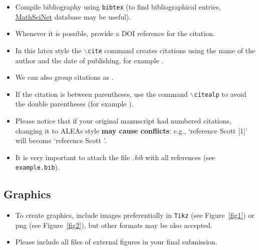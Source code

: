 \documentclass[reqno,final,11pt]{amsart}
\renewcommand{\cite}{\citet}
\theoremstyle{plain}
\theoremstyle{definition}
\theoremstyle{remark}
\begin{document}
\begin{itemize}
\item Compile bibliography using {\tt bibtex} (to find bibliographical entries,
\href{https://mathscinet.ams.org/mathscinet/}{MathSciNet} database may be
        useful).

\item Whenever it is possible, provide a DOI reference for the citation.

\item In this latex style the {\tt $\backslash$cite} command creates
citations using the name of the author and the date of publishing, for
example \cite{MR1557756}.

\item We can also group citations as \cite{MR1557756,MR1557978,MR1557852}.

\item If the citation is between parentheses, use the command
{\tt $\backslash$citealp} to avoid the double parentheses (for example
\citealp{MR0050410}).

\item Please notice that if your original manuscript had numbered
citations, changing it to ALEAs style \textbf{may cause conflicts}: e.g.,
`reference Scott [1]' will become `reference Scott \cite{MR1557756}'. 

\item It is very important to attach the file \emph{.bib} with all references
(see {\tt example.bib}).
\end{itemize}

\subsection{Graphics}
\label{ss_graphics}
\begin{itemize}
\item To create graphics, include images preferentially in \texttt{Tikz}
(see Figure~\ref{fig1}) or png (see Figure~\ref{fig2}), but other formats
may be also accepted.

\item Please include all files of external figures in your final submission.
\end{itemize}
\end{document}
